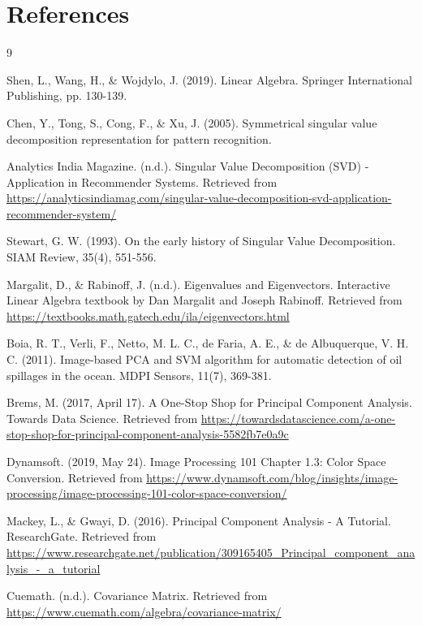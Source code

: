 \documentclass[12pt]{article}
\begin{document}
\section{References}
\begin{thebibliography}{9}

Shen, L., Wang, H., \& Wojdylo, J. (2019). Linear Algebra. Springer International Publishing, pp. 130-139.

Chen, Y., Tong, S., Cong, F., \& Xu, J. (2005). Symmetrical singular value decomposition representation for pattern recognition.

Analytics India Magazine. (n.d.). Singular Value Decomposition (SVD) - Application in Recommender Systems. Retrieved from \url{https://analyticsindiamag.com/singular-value-decomposition-svd-application-recommender-system/}

Stewart, G. W. (1993). On the early history of Singular Value Decomposition. SIAM Review, 35(4), 551-556.

Margalit, D., \& Rabinoff, J. (n.d.). Eigenvalues and Eigenvectors. Interactive Linear Algebra textbook by Dan Margalit and Joseph Rabinoff. Retrieved from \url{https://textbooks.math.gatech.edu/ila/eigenvectors.html}

Boia, R. T., Verli, F., Netto, M. L. C., de Faria, A. E., \& de Albuquerque, V. H. C. (2011). Image-based PCA and SVM algorithm for automatic detection of oil spillages in the ocean. MDPI Sensors, 11(7), 369-381.

Brems, M. (2017, April 17). A One-Stop Shop for Principal Component Analysis. Towards Data Science. Retrieved from \url{https://towardsdatascience.com/a-one-stop-shop-for-principal-component-analysis-5582fb7e0a9c}

Dynamsoft. (2019, May 24). Image Processing 101 Chapter 1.3: Color Space Conversion. Retrieved from \url{https://www.dynamsoft.com/blog/insights/image-processing/image-processing-101-color-space-conversion/}

Mackey, L., \& Gwayi, D. (2016). Principal Component Analysis - A Tutorial. ResearchGate. Retrieved from \url{https://www.researchgate.net/publication/309165405_Principal_component_analysis_-_a_tutorial}

Cuemath. (n.d.). Covariance Matrix. Retrieved from \url{https://www.cuemath.com/algebra/covariance-matrix/}


\end{thebibliography}
\end{document}
